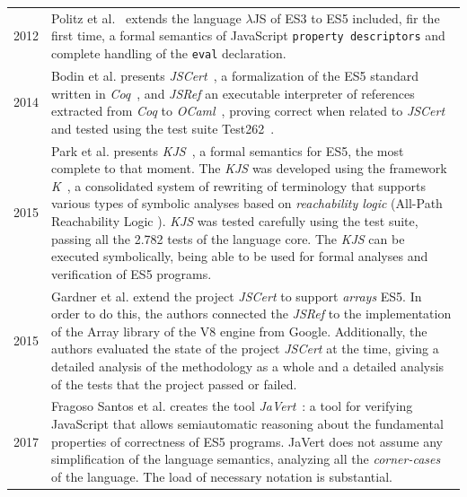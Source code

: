 \documentclass[runningheads]{llncs}
\begin{document}
\begin{table}[ht!]
\renewcommand{\arraystretch}{1.8}
\begin{tabular}{@{\,}r <{\hskip 2pt} !{\makebox[0pt]{\textbullet}\hskip-0.5pt\vrule width 1pt\hspace{\labelsep}} >{\raggedright\arraybackslash}p{316pt}}
  
  2012 & Politz et al.~\cite{Politz-2012} extends the language $\lambda$JS of ES3 to ES5 included, fir the first time, a formal semantics of JavaScript \texttt{property descriptors} and complete handling of the \texttt{eval} declaration.\\
  2014 & Bodin et al. presents \emph{JSCert}~\cite{JSCert-2014}, a formalization of the ES5 standard written in \emph{Coq}~\cite{Coq}, and \emph{JSRef} an executable interpreter of references extracted from \emph{Coq} to \emph{OCaml}~\cite{OCaml}, proving correct when related to \emph{JSCert} and tested using the test suite Test262~\cite{Test262}.\\
  2015 & Park et al. presents \emph{KJS}~\cite{KJS-2015}, a formal semantics for ES5, the most complete to that moment. The \emph{KJS}  was developed using the framework \emph{K}~\cite{Kframework}, a consolidated system of rewriting of terminology that supports various types of symbolic analyses based on \emph{reachability logic} (All-Path Reachability Logic \cite{All-Path_Reachability_Logic}). \emph{KJS} was tested carefully using the test suite, passing all the 2.782 tests of the language core. The \emph{KJS} can be executed symbolically, being able to be used for formal analyses and verification of ES5 programs.\\
  2015 & Gardner et al. \cite{JSCert_1Year-2015} extend the project \emph{JSCert} to support \emph{arrays} ES5. In order to do this, the authors connected the \emph{JSRef} to the implementation of the Array library of the V8 engine \cite{V8} from Google. Additionally, the authors evaluated the state of the project \emph{JSCert} at the time, giving a detailed analysis of the methodology as a whole and a detailed analysis of the tests that the project passed or failed.\\
  2017 & Fragoso Santos et al. creates the tool \emph{JaVert}~\cite{Javert-2017}: a tool for verifying JavaScript that allows semiautomatic reasoning about the fundamental properties of correctness of ES5 programs. JaVert does not assume any simplification of the language semantics, analyzing all the \emph{corner-cases} of the language. The load of necessary notation is substantial.\\

\end{tabular}
\end{table}
\end{document}
